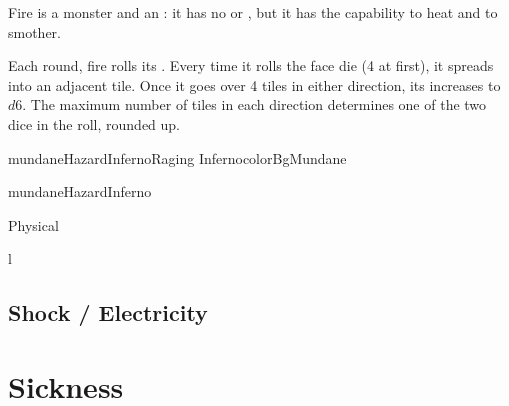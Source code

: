 Fire is a monster and an : it has no  or ,
but it has the capability to heat and to smother.


Each round, fire rolls its . Every time it rolls the face die (4 at first),
it spreads into an adjacent tile.
Once it goes over 4 tiles in either direction, its  increases to $d6$.
The maximum number of tiles in each direction determines one of the two dice in the  roll, rounded up.
\\




\begin{marginfigure}
	\begin{actorCardMiniAmerican}{mundaneHazardInferno}{Raging Inferno}{colorBgMundane}

		\begin{capabilitiesBox}{mundaneHazardInferno}
			\begin{capabilitiesTable}{Physical}
			\end{capabilitiesTable}
		\end{capabilitiesBox}
	\end{actorCardMiniAmerican}
\end{marginfigure}


\begin{wrapfigure}{l}{}
\end{wrapfigure}


\subsection{Shock / Electricity}




\section{Sickness}

